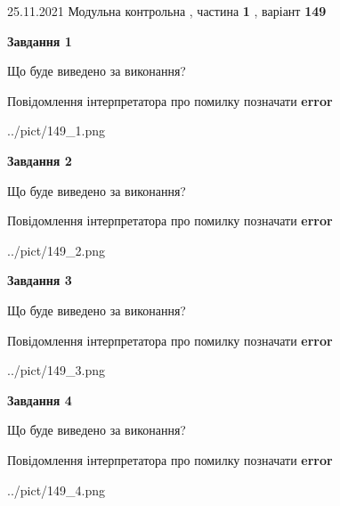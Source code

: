 \documentclass[10pt, ukrainian]{article}
\begin{document}
{25.11.2021 Модульна контрольна , частина \textbf { 1 }, варіант  \No \textbf { 149 }\par}
{
\begin {large}

{\begin {center}\textbf{Завдання 1}\end {center}}\par
Що буде виведено за виконання? \par
Повідомлення інтерпретатора про помилку позначати \textbf{error}

\begin{center}
	{../pict/149_1.png}
\end{center}
\newpage

{\begin {center}\textbf{Завдання 2}\end {center}}\par
Що буде виведено за виконання? \par
Повідомлення інтерпретатора про помилку позначати \textbf{error}

\begin{center}
	{../pict/149_2.png}
\end{center}
\newpage

{\begin {center}\textbf{Завдання 3}\end {center}}\par
Що буде виведено за виконання? \par
Повідомлення інтерпретатора про помилку позначати \textbf{error}

\begin{center}
	{../pict/149_3.png}
\end{center}
\newpage

{\begin {center}\textbf{Завдання 4}\end {center}}\par
Що буде виведено за виконання? \par
Повідомлення інтерпретатора про помилку позначати \textbf{error}

\begin{center}
	{../pict/149_4.png}
\end{center}
\newpage


\end{large}}
\end{document}

